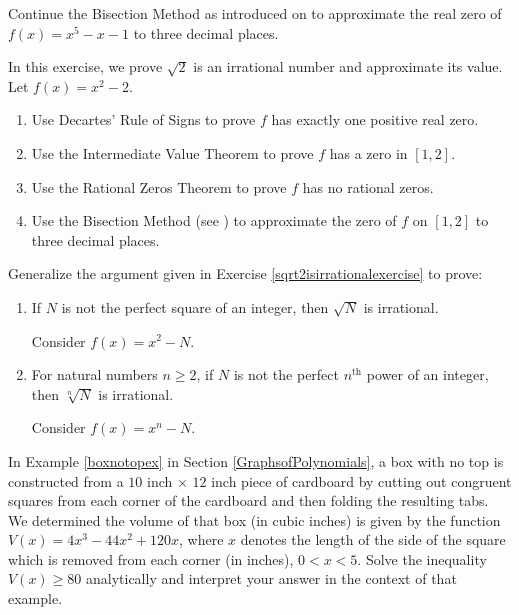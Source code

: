 \documentclass{ximera}
\begin{document}
\begin{problem}\label{bisectionexercise} 
Continue  the Bisection Method as introduced on  \pageref{bisectionmethod} to approximate the real zero of $f(x) = x^5-x-1$ to three decimal places.
\end{problem}

\begin{problem}\label{sqrt2isirrationalexercise} 
In this exercise, we prove $\sqrt{2}$ is an irrational number and approximate its value.  Let $f(x) = x^2-2$.

\begin{enumerate} 

\item Use Decartes' Rule of Signs to prove $f$ has exactly one positive real zero.

\item Use the Intermediate Value Theorem to prove $f$ has a zero in $[1,2]$.

\item\label{sqrt2isirrationalexercise}  
Use the Rational Zeros Theorem to prove $f$ has no rational zeros.

\item  Use the Bisection Method (see  \pageref{bisectionmethod}) to approximate the zero of $f$ on $[1,2]$ to three decimal places.
\end{enumerate}
\end{problem}

\begin{problem}
Generalize the argument given in Exercise \ref{sqrt2isirrationalexercise} to prove:

\begin{enumerate}

\item If $N$ is not the perfect square of an integer, then $\sqrt{N}$ is irrational.
\begin{hint}
Consider $f(x) = x^2-N$.
\end{hint}

\item  For natural numbers $n \geq 2$, if $N$ is not the perfect $n^{\text{th}}$ power of an integer, then $\sqrt[n]{N}$ is irrational.
\begin{hint}
Consider $f(x) = x^n-N$.
\end{hint}

\end{enumerate}
\end{problem}

\begin{problem}
In Example \ref{boxnotopex} in Section \ref{GraphsofPolynomials}, a box with no top is constructed from a $10$ inch $\times$ $12$ inch piece of cardboard by cutting out congruent squares from each corner of the cardboard and then folding the resulting tabs.  We determined the volume of that box (in cubic inches) is given by  the function$V(x) = 4x^3-44x^2+120x$, where $x$ denotes the length of the side of the square which is removed from each corner (in inches), $0 < x < 5$.  Solve the inequality $V(x) \geq 80$ analytically and interpret your answer in the context of that example. 
\end{problem}
\end{document}
